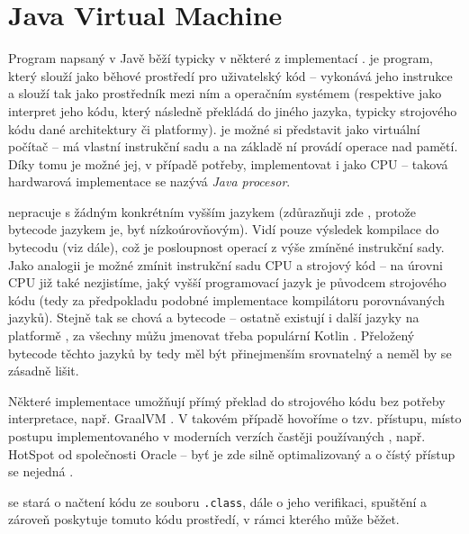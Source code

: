 \chapter{Java Virtual Machine}
Program napsaný v Javě běží typicky v některé z implementací .  je program, který slouží jako běhové prostředí pro uživatelský kód -- vykonává jeho instrukce a slouží tak jako prostředník mezi ním a operačním systémem (respektive jako interpret jeho kódu, který následně překládá do jiného jazyka, typicky strojového kódu dané architektury či platformy).  je možné si představit jako virtuální počítač -- má vlastní instrukční sadu a na základě ní provádí operace nad pamětí. Díky tomu je možné jej, v případě potřeby, implementovat i jako CPU -- taková hardwarová implementace se nazývá \textit{Java procesor}. 

 nepracuje s žádným konkrétním vyšším jazykem (zdůrazňuji zde , protože bytecode jazykem je, byť nízkoúrovňovým). Vidí pouze výsledek kompilace do bytecodu (viz dále), což je posloupnost operací z výše zmíněné instrukční sady. Jako analogii je možné zmínit instrukční sadu CPU a strojový kód -- na úrovni CPU již také nezjistíme, jaký vyšší programovací jazyk je původcem strojového kódu (tedy za předpokladu podobné implementace kompilátoru porovnávaných jazyků). Stejně tak se chová  a bytecode -- ostatně existují i další jazyky na platformě , za všechny můžu jmenovat třeba populární Kotlin \cite{jvms-jvm}. Přeložený bytecode těchto jazyků by tedy měl být přinejmenším srovnatelný a neměl by se zásadně lišit.

Některé implementace  umožňují přímý překlad do strojového kódu bez potřeby interpretace, např. GraalVM \cite{graalvm}. V takovém případě hovoříme o tzv.  přístupu, místo  postupu implementovaného v moderních verzích častěji používaných , např. HotSpot od společnosti Oracle -- byť je zde silně optimalizovaný a o čístý  přístup se nejedná \cite{hotspot-whitepaper}.

 se stará o načtení kódu ze souboru \texttt{.class}, dále o jeho verifikaci, spuštění a zároveň poskytuje tomuto kódu prostředí, v rámci kterého může běžet.

